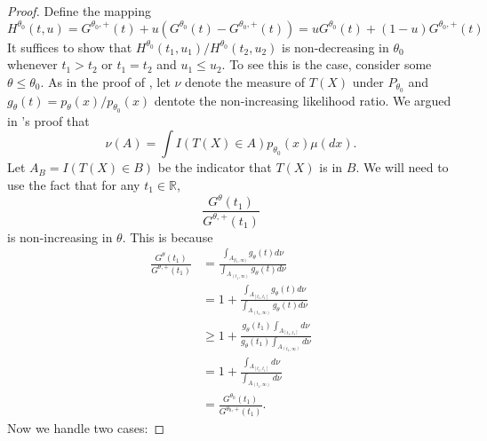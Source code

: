 \documentclass{article}
\newcommand{\R}{\mathbb{R}}
\begin{document}
\begin{appendix}
\begin{proof}
    Define the mapping 
    \begin{equation*}
        H^{\theta_0}(t, u) = G^{\theta_0, +}(t) + u (G^{\theta_0}(t) -  G^{\theta_0, +}(t)) = uG^{\theta_0}(t)  + (1-u) G^{\theta_0, +}(t)
    \end{equation*}
    It suffices to show that $H^{\theta_0}(t_1, u_1)/H^{\theta_0}(t_2, u_2)$ is non-decreasing in $\theta_0$ whenever $t_1 > t_2$ or $t_1 = t_2$ and $u_1 \leq u_2$. To see this is the case, consider some $\theta \leq \theta_0$. As in the proof of , let $\nu$ denote the measure of $T(X)$ under $P_{\theta_0}$ and $g_{\theta}(t) = p_{\theta}(x)/p_{\theta_0}(x)$ dentote the non-increasing likelihood ratio. We argued in 's proof that 
    \begin{equation*}
        \nu(A) = \int I(T(X) \in A)p_{\theta_0}(x) \mu(dx).
    \end{equation*}
    Let $A_{B} =  I(T(X) \in B)$ be the indicator that $T(X)$ is in $B$. We will need to use the fact that for any $t_1 \in \R$, 
    \begin{equation*}
        \frac{G^{\theta}(t_1)}{G^{\theta, +}(t_1)}
    \end{equation*}
    is non-increasing in $\theta$. This is because
    \begin{align*}
        \frac{G^{\theta}(t_1)}{G^{\theta, +}(t_1)} &= \frac{\int_{A_{[t_1, \infty)}} g_{\theta}(t) d \nu }{\int_{A_{(t_1, \infty)}} g_{\theta}(t) d \nu}\\
        &= 1 + \frac{\int_{A_{[t_1, t_1]}} g_{\theta}(t) d \nu }{\int_{A_{(t_1, \infty)}} g_{\theta}(t)  d \nu}\\
        &\geq 1 +  \frac{ g_{\theta}(t_1) \int_{A_{[t_1, t_1]}}  d \nu }{g_{\theta}(t_1) \int_{A_{(t_1, \infty)}}  d\nu}\\
        &= 1 +  \frac{  \int_{A_{[t_1, t_1]}}  d \nu }{\int_{A_{(t_1, \infty)}}  d\nu}\\
        &=  \frac{G^{\theta_0}(t_1)}{G^{\theta_0, +}(t_1)}. 
    \end{align*}
    Now we handle two cases:\newline 


\end{proof}
\end{appendix}
\end{document}
